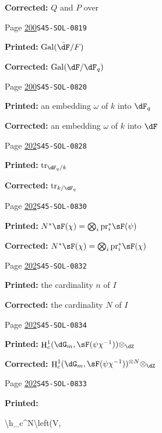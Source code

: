 \documentclass[oneside]{book}
\DeclareMathOperator{\gal}{Gal}
\DeclareMathOperator{\h}{H}
\DeclareMathOperator{\tr}{tr}
\newcommand{\pr}{\mathrm{pr}} %
\theoremstyle{sga-source}
\theoremstyle{sga-source-dash}
\theoremstyle{sga-source-dotdash}
\theoremstyle{sga-source-number-note-dash}
\theoremstyle{sga-source-note-number-dotdash}
\theoremstyle{sga-source-example-dotdash}
\theoremstyle{sga-source-inline-number}
\theoremstyle{sga-source-bare-number}
\theoremstyle{sga-source}
\begin{document}
\begin{description}
\par\noindent\textbf{Corrected:} $Q$ and $P$ over
\smallskip
\item[\hypertarget{apparatus:EN-0132}{132}] Page \hyperlink{printpage:en:200}{200}\quad\texttt{S45-SOL-0819}
\par\noindent\textbf{Printed:} \(\gal(\bar\dF/F)\)
\par\noindent\textbf{Corrected:} \(\gal(\dF/\dF_q)\)
\smallskip
\item[\hypertarget{apparatus:EN-0133}{133}] Page \hyperlink{printpage:en:200}{200}\quad\texttt{S45-SOL-0820}
\par\noindent\textbf{Printed:} an embedding $\omega$ of $k$ into $\dF_q$
\par\noindent\textbf{Corrected:} an embedding $\omega$ of $k$ into $\dF$
\smallskip
\item[\hypertarget{apparatus:EN-0134}{134}] Page \hyperlink{printpage:en:202}{202}\quad\texttt{S45-SOL-0828}
\par\noindent\textbf{Printed:} \(\tr_{\dF_q/k}\)
\par\noindent\textbf{Corrected:} \(\tr_{k/\dF_q}\)
\smallskip
\item[\hypertarget{apparatus:EN-0135}{135}] Page \hyperlink{printpage:en:202}{202}\quad\texttt{S45-SOL-0830}
\par\noindent\textbf{Printed:} \(N^\ast\sF(\chi) = \bigotimes_i \pr_i^\ast\sF(\psi)\)
\par\noindent\textbf{Corrected:} \(N^\ast\sF(\chi) = \bigotimes_i \pr_i^\ast\sF(\chi)\)
\smallskip
\item[\hypertarget{apparatus:EN-0136}{136}] Page \hyperlink{printpage:en:202}{202}\quad\texttt{S45-SOL-0832}
\par\noindent\textbf{Printed:} the cardinality $n$ of $I$
\par\noindent\textbf{Corrected:} the cardinality $N$ of $I$
\smallskip
\item[\hypertarget{apparatus:EN-0137}{137}] Page \hyperlink{printpage:en:202}{202}\quad\texttt{S45-SOL-0834}
\par\noindent\textbf{Printed:} \(\h_c^1(\dG_m,\sF(\psi\chi^{-1})) \otimes_\dZ\)
\par\noindent\textbf{Corrected:} \(\h_c^1(\dG_m,\sF(\psi\chi^{-1}))^{\otimes N} \otimes_\dZ\)
\smallskip
\item[\hypertarget{apparatus:EN-0138}{138}] Page \hyperlink{printpage:en:202}{202}\quad\texttt{S45-SOL-0833}
\par\noindent\textbf{Printed:} {\footnotesize\ttfamily\raggedright \textbackslash{}\allowbreak{}h\_\allowbreak{}c\textasciicircum{}\allowbreak{}N\textbackslash{}\allowbreak{}left(\allowbreak{}V,\allowbreak{}\par}

\end{description}
\end{document}
